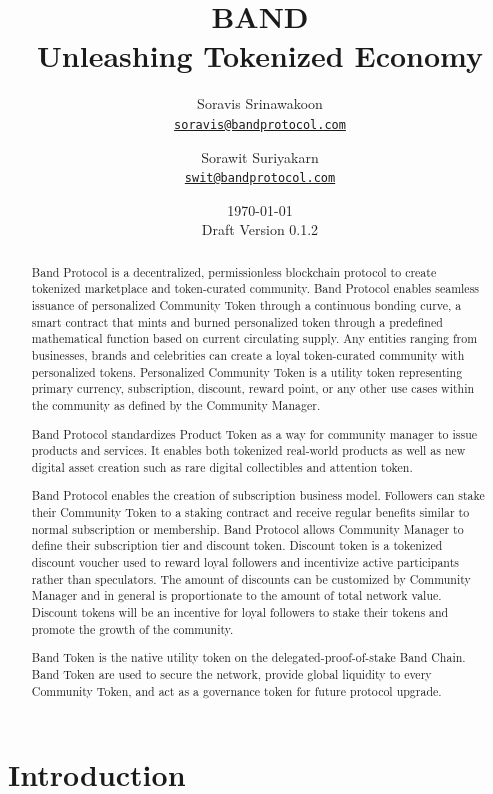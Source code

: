 \documentclass[letterpaper,11pt]{article}
\title{\LARGE BAND\\
    \Large Unleashing Tokenized Economy}
\author{
        Soravis Srinawakoon\\
        \small\href{mailto:soravis@bandprotocol.com}
            {\nolinkurl{soravis@bandprotocol.com}}
    \and
        Sorawit Suriyakarn\\
        \small\href{mailto:swit@bandprotocol.com}
            {\nolinkurl{swit@bandprotocol.com}}
    }
\date{\today\\\small Draft Version 0.1.2}
\begin{document}
\maketitle

\begin{abstract}

Band Protocol is a decentralized, permissionless blockchain protocol to create tokenized marketplace and token-curated community. Band Protocol enables seamless issuance of personalized Community Token through a continuous bonding curve, a smart contract that mints and burned personalized token through a predefined mathematical function based on current circulating supply. Any entities ranging from businesses, brands and celebrities can create a loyal token-curated community with personalized tokens. Personalized Community Token is a utility token representing primary currency, subscription, discount, reward point, or any other use cases within the community as defined by the Community Manager.

Band Protocol standardizes Product Token as a way for community manager to issue products and services. It enables both tokenized real-world products as well as new digital asset creation such as rare digital collectibles and attention token.

Band Protocol enables the creation of subscription business model. Followers can stake their Community Token to a staking contract and receive regular benefits similar to normal subscription or membership. Band Protocol allows Community Manager to define their subscription tier and discount token. Discount token is a tokenized discount voucher used to reward loyal followers and incentivize active participants rather than speculators. The amount of discounts can be customized by Community Manager and in general is proportionate to the amount of total network value. Discount tokens will be an incentive for loyal followers to stake their tokens and promote the growth of the community.

Band Token is the native utility token on the delegated-proof-of-stake Band Chain. Band Token are used to secure the network, provide global liquidity to every Community Token, and act as a governance token for future protocol upgrade.

\end{abstract}

\newpage
{
\hypersetup{linkcolor=black}
\tableofcontents
}
\newpage

\section{Introduction}
\end{document}
